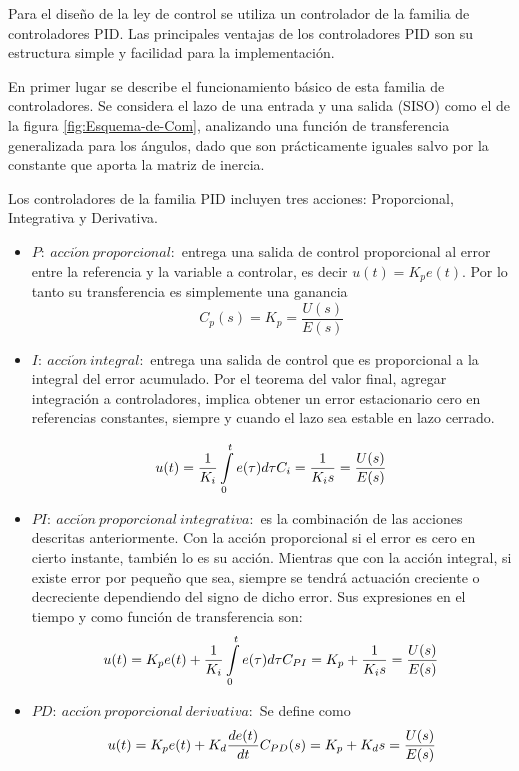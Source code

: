 \documentclass[\main/main.tex]{subfiles}
\begin{document}
Para el diseño de la ley de control se utiliza un controlador de la
familia de controladores PID. Las principales ventajas de los controladores
PID son su estructura simple y facilidad para la implementación. 

En primer lugar se describe el funcionamiento básico de esta familia
de controladores. Se considera el lazo de una entrada y una salida
(SISO) como el de la figura \ref{fig:Esquema-de-Com}, analizando una función
de transferencia generalizada para los ángulos, dado que son prácticamente
iguales salvo por la constante que aporta la matriz de inercia. 

Los controladores de la familia PID incluyen tres acciones: Proporcional,
Integrativa y Derivativa. 

\begin{itemize}
\item $P:\ acci\acute{o}n\ proporcional:$ entrega una salida de control
proporcional al error entre la referencia y la variable a controlar,
es decir $u(t)=K_{p}e(t)$. Por lo tanto su transferencia es simplemente
una ganancia 
\[
C_{p}(s)=K_{p}=\frac{U(s)}{E(s)}
\]
\end{itemize}

\begin{itemize}
\item $I:\ acci\acute{o}n\ integral:$ entrega una salida de control que
es proporcional a la integral del error acumulado. Por el teorema
del valor final, agregar integración a controladores, implica obtener
un error estacionario cero en referencias constantes, siempre y cuando el lazo sea estable en lazo cerrado.

\[
u(t)=\frac{1}{K_{i}}\intop_{0}^{t}e(\tau)d\tau\hfill C_{i}=\frac{1}{K_{i}s}=\frac{U(s)}{E(s)}
\]

\item $PI:\ acci\acute{o}n\ proporcional\ integrativa:$ es la combinación
de las acciones descritas anteriormente. Con la acción proporcional
si el error es cero en cierto instante, también lo es su acción. Mientras
que con la acción integral, si existe error por pequeño que sea, siempre
se tendrá actuación creciente o decreciente dependiendo del signo
de dicho error. Sus expresiones en el tiempo y como función de transferencia
son:
\[
u(t)=K_{p}e(t)+\frac{1}{K_{i}}\intop_{0}^{t}e(\tau)d\tau\hfill C_{PI}=K_{p}+\frac{1}{K_{i}s}=\frac{U(s)}{E(s)}
\]
\end{itemize}

 
\begin{itemize}
\item $PD:\ acci\acute{o}n\ proporcional\ derivativa:$ Se define como 
\[
u(t)=K_{p}e(t)+K_{d}\frac{de(t)}{dt}\hfill C_{PD}(s)=K_{p}+K_{d}s=\frac{U(s)}{E(s)}
\]
\end{itemize}
\end{document}
